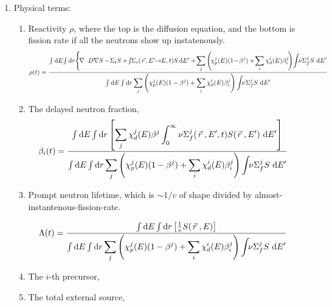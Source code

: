 \documentclass{school-22.211-notes}
\begin{document}
\begin{enumerate}
\begin{enumerate}
    \item Physical terms: 
      \begin{enumerate}
      \item Reactivity $\rho$, where the top is the diffusion equation, and the bottom is fission rate if all the neutrons show up instatenously. 
        \scriptsize
        \begin{align}
          \rho (t) &= \frac{\int \bsp \dE \! \int \bsp \dr \Bigg\{ \!\divergence \! D  \gradient S  - \! \Sigma_t S  + \! \int \bsp \Sigma_s (\vecr \!, E' \bsp \to \bsp E, t) S \! \dE'   
            + \! \Sum_j \left( \! \chi_p^j (E) (1 \! - \! \beta^j) +  \! \Sum_i \chi_d^i (E) \beta_i^j \! \right) \! \int \bsp \nu \Sigma_f^j  S \dE'  }{\int \bsp \dE \int \bsp \dr \Sum_j \left( \chi_p^j (E) (1-\beta^j) + \Sum_i \chi_d^i (E) \beta_i^j \right) \int \bsp \nu \Sigma_f^j S \dE'} 
        \end{align}
        \normalsize

      \item The delayed neutron fraction, 
        \begin{align}
          \beta_i (t) &= \frac{\int \bsp \dE \int \bsp \dr \left[ \Sum_j \chi_d^j (E) \beta^j \int_0^{\infty} \nu \Sigma_f^j (\vecr, E', t) S(\vecr, E') \dE' \right] }{\int \bsp \dE \int \bsp \dr \Sum_j \left( \chi_p^j (E) (1-\beta^j) + \Sum_i \chi_d^i (E) \beta_i^j \right) \int \bsp \nu \Sigma_f^j S \dE'} 
        \end{align}

      \item Prompt neutron lifetime, which is $\sim 1/v$ of shape divided by almost-instantenous-fission-rate. 

        \begin{align}
          \Lambda (t) &= \frac{\int \bsp \dE \int \bsp  \dr \left[ \frac{1}{v} S(\vecr, E) \right] }{\int \bsp \dE \int \bsp \dr \Sum_j \left( \chi_p^j (E) (1-\beta^j) + \Sum_i \chi_d^i (E) \beta_i^j \right) \int \bsp \nu \Sigma_f^j S \dE'} 
        \end{align}

      \item The $i$-th precursor, 
      \item The total external source, 
      \end{enumerate}



\end{enumerate}
\end{enumerate}
\end{document}

